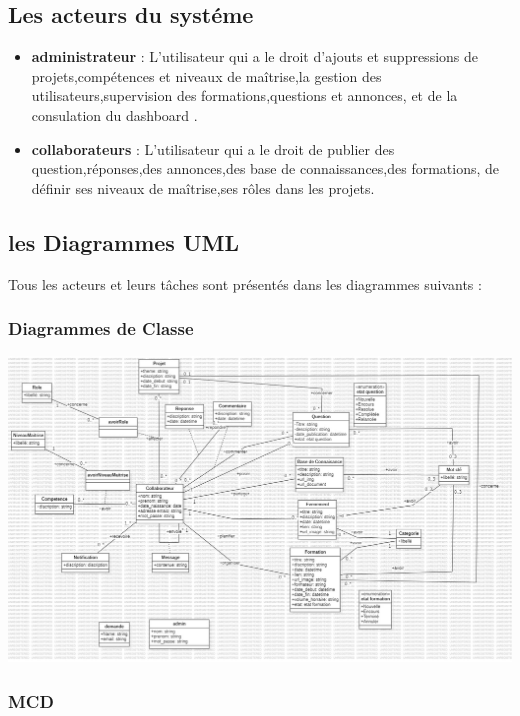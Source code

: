 \documentclass{article}
\begin{document}
        \subsection{Les acteurs du systéme}  
            \begin{itemize}
                \item \textbf{administrateur} : L'utilisateur qui a le droit d'ajouts et suppressions de projets,compétences et niveaux de maîtrise,la gestion des utilisateurs,supervision des formations,questions et annonces, et de la consulation du dashboard .
                \item \textbf{collaborateurs} : L'utilisateur qui a le droit de publier des question,réponses,des annonces,des base de connaissances,des formations, de définir ses niveaux de maîtrise,ses rôles dans les projets.
            \end{itemize}

        \subsection{les Diagrammes UML}
            Tous les acteurs et leurs tâches sont présentés dans les diagrammes suivants :
            
            \subsubsection{Diagrammes de Classe}
                \begin{center}
                    \centering
                    \includegraphics[width=1.0\textwidth]{assets/diagrammes/class.jpg}
                \end{center}

            \subsubsection{MCD}
\end{document}
